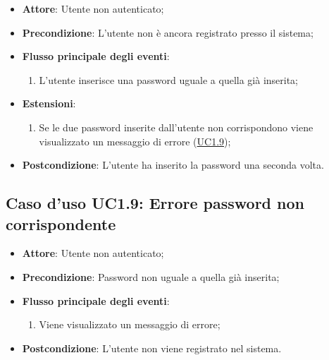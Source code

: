 \documentclass[12pt,a4paper]{article}
\begin{document}
\begin{itemize}

\item \textbf{Attore}: Utente non autenticato; 
\item \textbf{Precondizione}: L’utente non è ancora registrato presso il sistema;

\item \textbf{Flusso principale degli eventi}:
\begin{enumerate}
	\item L'utente inserisce una password uguale a quella già inserita;
	
\end{enumerate}
\item \textbf{Estensioni}:
\begin{enumerate}
	\item Se le due password inserite dall'utente non corrispondono viene visualizzato un messaggio di errore (\hyperlink{UC1.9}{UC1.9});
	
\end{enumerate}
\item \textbf{Postcondizione}: L'utente ha inserito la password una seconda volta.
\end{itemize}
\hypertarget{UC1.9}{}
\subsection{Caso d'uso UC1.9: Errore password non corrispondente}

\begin{itemize}

\item \textbf{Attore}: Utente non autenticato; 
\item \textbf{Precondizione}: Password non uguale a quella già inserita;

\item \textbf{Flusso principale degli eventi}:
\begin{enumerate}
	\item Viene visualizzato un messaggio di errore;
	
\end{enumerate}
\item \textbf{Postcondizione}: L'utente non viene registrato nel sistema.
\end{itemize}
\hypertarget{UC2}{}
\end{document}
